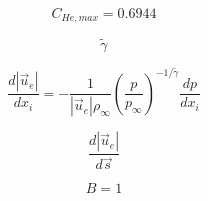 \begin{equation}
C_{He,max} = 0.6944
\end{equation}

\begin{equation}
\tilde \gamma
\end{equation}

\begin{equation}
\frac{d \left| \vec{u}_e \right|}{d x_i} = -\frac{1}{\left| \vec{u}_e \right| \rho_{\infty}}
\left( \frac{p}{p_{\infty}} \right)^{-1/ \tilde \gamma} \frac{dp}{dx_i}
\end{equation}

\begin{equation}
\frac{d \left| \vec{u}_e \right|}{d \vec{s}}
\end{equation}

\begin{equation}
B=1
\end{equation}


